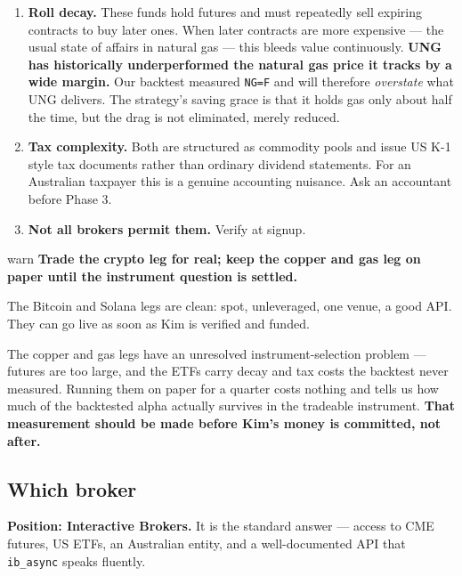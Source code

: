 \documentclass[11pt,a4paper]{article}
\begin{document}
\begin{enumerate}[leftmargin=2em]
    \item \textbf{Roll decay.} These funds hold futures and must
          repeatedly sell expiring contracts to buy later ones. When
          later contracts are more expensive --- the usual state of
          affairs in natural gas --- this bleeds value continuously.
          \textbf{UNG has historically underperformed the natural gas
          price it tracks by a wide margin.} Our backtest measured
          \texttt{NG=F} and will therefore \emph{overstate} what UNG
          delivers. The strategy's saving grace is that it holds gas
          only about half the time, but the drag is not eliminated,
          merely reduced.
    \item \textbf{Tax complexity.} Both are structured as commodity
          pools and issue US K-1 style tax documents rather than
          ordinary dividend statements. For an Australian taxpayer this
          is a genuine accounting nuisance. Ask an accountant before
          Phase 3.
    \item \textbf{Not all brokers permit them.} Verify at signup.
\end{enumerate}

\begin{resultbox}{warn}
\textbf{Trade the crypto leg for real; keep the copper and gas leg on
paper until the instrument question is settled.}

The Bitcoin and Solana legs are clean: spot, unleveraged, one venue,
a good API. They can go live as soon as Kim is verified and funded.

The copper and gas legs have an unresolved instrument-selection
problem --- futures are too large, and the ETFs carry decay and tax
costs the backtest never measured. Running them on paper for a quarter
costs nothing and tells us how much of the backtested alpha actually
survives in the tradeable instrument. \textbf{That measurement should
be made before Kim's money is committed, not after.}
\end{resultbox}

\subsection{Which broker}

\textbf{Position: Interactive Brokers.} It is the standard answer ---
access to CME futures, US ETFs, an Australian entity, and a
well-documented API that \texttt{ib\_async} speaks fluently.
\end{document}
